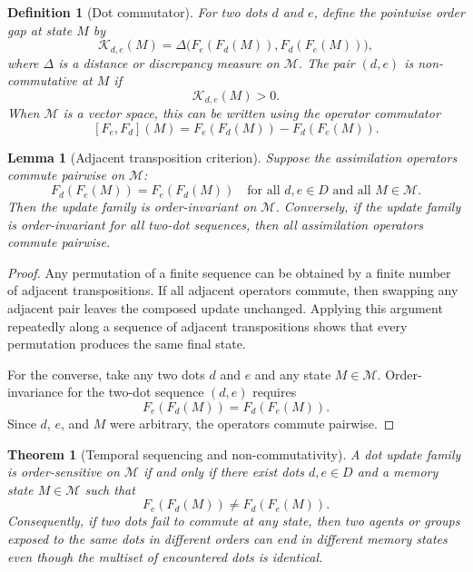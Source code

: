 \documentclass[11pt]{article}
\newtheorem{definition}{Definition}
\newtheorem{theorem}{Theorem}
\newtheorem{lemma}{Lemma}
\theoremstyle{remark}
\begin{document}
\begin{definition}[Dot commutator]\label{def:dot-commutator}
For two dots $d$ and $e$, define the pointwise order gap at state $M$ by
$$
\mathcal{K}_{d,e}(M)
=
\Delta\big(F_e(F_d(M)),F_d(F_e(M))\big),
$$
where $\Delta$ is a distance or discrepancy measure on $\mathcal{M}$.
The pair $(d,e)$ is non-commutative at $M$ if
$$
\mathcal{K}_{d,e}(M)>0.
$$
When $\mathcal{M}$ is a vector space, this can be written using the
operator commutator
$$
[F_e,F_d](M)=F_e(F_d(M))-F_d(F_e(M)).
$$
\end{definition}

\begin{lemma}[Adjacent transposition criterion]\label{lem:adjacent-transposition}
Suppose the assimilation operators commute pairwise on $\mathcal{M}$:
$$
F_d(F_e(M))=F_e(F_d(M))
\quad
\text{for all } d,e\in D \text{ and all } M\in\mathcal{M}.
$$
Then the update family is order-invariant on $\mathcal{M}$. Conversely,
if the update family is order-invariant for all two-dot sequences, then
all assimilation operators commute pairwise.
\end{lemma}

\begin{proof}
Any permutation of a finite sequence can be obtained by a finite number
of adjacent transpositions. If all adjacent operators commute, then
swapping any adjacent pair leaves the composed update unchanged. Applying
this argument repeatedly along a sequence of adjacent transpositions
shows that every permutation produces the same final state.

For the converse, take any two dots $d$ and $e$ and any state
$M\in\mathcal{M}$. Order-invariance for the two-dot sequence $(d,e)$
requires
$$
F_e(F_d(M))=F_d(F_e(M)).
$$
Since $d$, $e$, and $M$ were arbitrary, the operators commute pairwise.
\end{proof}

\begin{theorem}[Temporal sequencing and non-commutativity]\label{thm:temporal-sequencing}
A dot update family is order-sensitive on $\mathcal{M}$ if and only if
there exist dots $d,e\in D$ and a memory state $M\in\mathcal{M}$ such
that
$$
F_e(F_d(M))\neq F_d(F_e(M)).
$$
Consequently, if two dots fail to commute at any state, then two agents
or groups exposed to the same dots in different orders can end in
different memory states even though the multiset of encountered dots is
identical.
\end{theorem}
\end{document}

